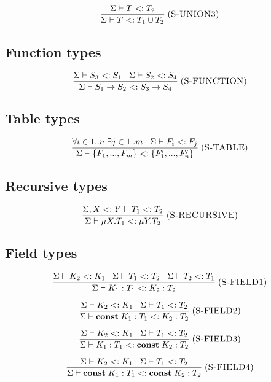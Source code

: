 \documentclass[12pt]{article}
\newcommand{\Const}{\mathbf{const}}
\newcommand{\mylabel}[1]{\; (\textsc{#1})}
\newcommand{\subtype}{<:}
\newcommand{\senv}{\Sigma}
\begin{document}
\[
\frac{\senv \vdash T \subtype T_{2}}
     {\senv \vdash T \subtype T_{1} \cup T_{2}}
\mylabel{S-UNION3}
\]

\subsection{Function types}

\[
\frac{\senv \vdash S_{3} \subtype S_{1} \;\;\;
      \senv \vdash S_{2} \subtype S_{4}}
     {\senv \vdash S_{1} \rightarrow S_{2} \subtype S_{3} \rightarrow S_{4}}
\mylabel{S-FUNCTION}
\]

\subsection{Table types}

\[
\frac{\forall i \in 1..n \; \exists j \in 1..m \;\;\;
      \senv \vdash F_{i} \subtype F_{j}}
     {\senv \vdash \{F_{1}, ..., F_{m}\} \subtype \{F_{1}', ..., F_{n}'\}}
\mylabel{S-TABLE}
\]

\subsection{Recursive types}

\[
\frac{\senv, X \subtype Y \vdash T_{1} \subtype T_{2}}
     {\senv \vdash \mu X.T_{1} \subtype \mu Y.T_{2}}
\mylabel{S-RECURSIVE}
\]

\subsection{Field types}

\[
\frac{\senv \vdash K_{2} \subtype K_{1} \;\;\;
      \senv \vdash T_{1} \subtype T_{2} \;\;\;
      \senv \vdash T_{2} \subtype T_{1}}
     {\senv \vdash K_{1}:T_{1} \subtype K_{2}:T_{2}}
\mylabel{S-FIELD1}
\]

\[
\frac{\senv \vdash K_{2} \subtype K_{1} \;\;\;
      \senv \vdash T_{1} \subtype T_{2}}
     {\senv \vdash \Const \; K_{1}:T_{1} \subtype K_{2}:T_{2}}
\mylabel{S-FIELD2}
\]

\[
\frac{\senv \vdash K_{2} \subtype K_{1} \;\;\;
      \senv \vdash T_{1} \subtype T_{2}}
     {\senv \vdash K_{1}:T_{1} \subtype \Const \; K_{2}:T_{2}}
\mylabel{S-FIELD3}
\]

\[
\frac{\senv \vdash K_{2} \subtype K_{1} \;\;\;
      \senv \vdash T_{1} \subtype T_{2}}
     {\senv \vdash \Const \; K_{1}:T_{1} \subtype \Const \; K_{2}:T_{2}}
\mylabel{S-FIELD4}
\]
\end{document}
